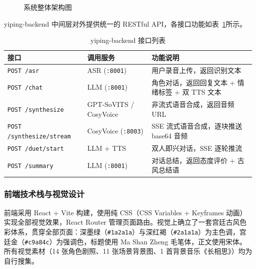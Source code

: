\documentclass[12pt,a4paper]{article}
\begin{document}
\begin{figure}[H]
\caption{系统整体架构图}
\label{fig:system-arch}
\end{figure}

yiping-backend 中间层对外提供统一的 RESTful API，各接口功能如表~\ref{tab:api}所示。

\begin{table}[H]
\centering
\caption{yiping-backend 接口列表}
\label{tab:api}
\begin{tabularx}{\textwidth}{p{4.2cm}p{3.2cm}X}
\toprule
\textbf{接口} & \textbf{调用服务} & \textbf{功能说明} \\
\midrule
\texttt{POST /asr}                & ASR (\texttt{:8001})       & 用户录音上传，返回识别文本 \\
\texttt{POST /chat}               & LLM (\texttt{:8001})       & 角色对话，返回回复文本 + 情绪标签 + 双 TTS 文本 \\
\texttt{POST /synthesize}         & GPT-SoVITS / CosyVoice   & 非流式语音合成，返回音频 URL \\
\texttt{POST /synthesize/stream}  & CosyVoice (\texttt{:8003}) & SSE 流式语音合成，逐块推送 base64 音频 \\
\texttt{POST /duet/start}         & LLM + TTS                 & 双人即兴对话，SSE 逐轮推流 \\
\texttt{POST /summary}            & LLM (\texttt{:8001})       & 对话总结，返回态度评价 + 古风总结语 \\
\bottomrule
\end{tabularx}
\end{table}

\subsubsection{前端技术栈与视觉设计}

前端采用 React + Vite 构建，使用纯 CSS（CSS Variables + Keyframes 动画）实现全部视觉效果，React Router 管理页面路由。视觉上确立了一套宫廷古风色彩体系，贯穿全部页面：深墨绿（\texttt{\#1a2a1a}）与深红褐（\texttt{\#2a1a1a}）为主色调，宫廷金（\texttt{\#c9a84c}）为强调色，标题使用 Ma Shan Zheng 毛笔体，正文使用宋体。所有视觉素材（14 张角色剧照、11 张场景背景图、1 首背景音乐《长相思》）均为自行搜集。
\end{document}
